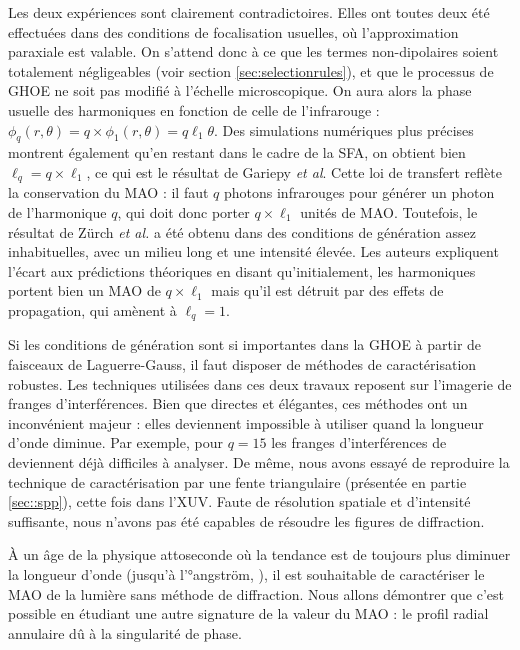 Les deux expériences sont clairement contradictoires. Elles ont toutes deux été effectuées dans des conditions de focalisation usuelles, où l'approximation paraxiale est valable. On s'attend donc à ce que les termes non-dipolaires soient totalement négligeables (voir section \ref{sec:selectionrules}), et que le processus de GHOE ne soit pas modifié à l'échelle microscopique. On aura alors la phase usuelle des harmoniques en fonction de celle de l'infrarouge : $\phi_q(r,\theta) = q\times\phi_1(r,\theta) = q\ell_1\theta$. Des simulations numériques plus précises  montrent également qu'en restant dans le cadre de la SFA, on obtient bien $\ell_{q}=q\times\ell_1$, ce qui est le résultat de Gariepy \textit{et al}. Cette loi de transfert reflète la conservation du MAO : il faut $q$ photons infrarouges pour générer un photon de l'harmonique $q$, qui doit donc porter $q\times\ell_1$ unités de MAO.
Toutefois, le résultat de Zürch \textit{et al.} a été obtenu dans des conditions de génération assez inhabituelles, avec un milieu long et une intensité élevée. Les auteurs expliquent l'écart aux prédictions théoriques en disant qu'initialement, les harmoniques portent bien un MAO de $q\times\ell_1$ mais qu'il est détruit par des effets de propagation, qui amènent à $\ell_q = 1$.

Si les conditions de génération sont si importantes dans la GHOE à partir de faisceaux de Laguerre-Gauss, il faut disposer de méthodes de caractérisation robustes. Les techniques utilisées dans ces deux travaux reposent sur l'imagerie de franges d'interférences. Bien que directes et élégantes, ces méthodes ont un inconvénient majeur : elles deviennent impossible à utiliser quand la longueur d'onde diminue. Par exemple, pour $q=15$ les franges d'interférences de  deviennent déjà difficiles à analyser. De même, nous avons essayé de reproduire la technique de caractérisation par une fente triangulaire (présentée en partie \ref{sec::spp}), cette fois dans l'XUV. Faute de résolution spatiale et d'intensité suffisante, nous n'avons pas été capables de résoudre les figures de diffraction.

\`{A} un âge de la physique attoseconde où la tendance est de toujours plus diminuer la longueur d'onde (jusqu'à l'°angström, ), il est souhaitable de caractériser le MAO de la lumière sans méthode de diffraction. Nous allons démontrer que c'est possible en étudiant une autre signature de la valeur du MAO : le profil radial annulaire dû à la singularité de phase.

